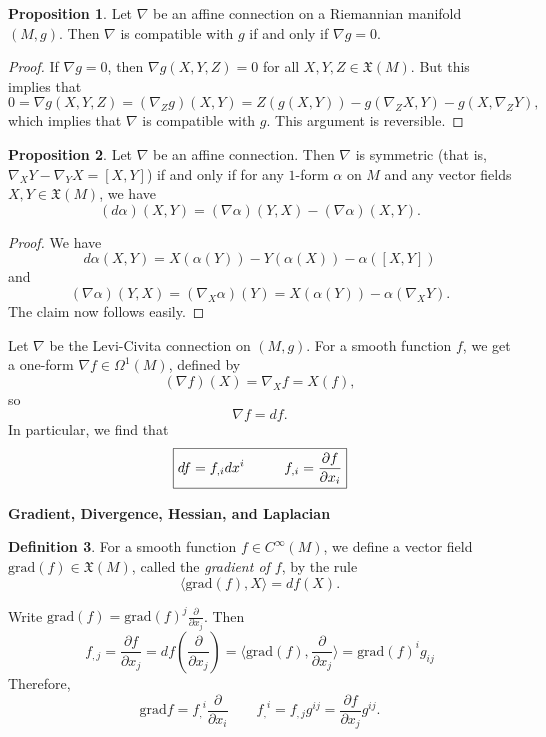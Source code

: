 \documentclass{amsart}
\numberwithin{equation}{section}
\theoremstyle{definition}
\newtheorem{definition}{Definition} [section]
\theoremstyle{theorem}
\newtheorem{proposition}[definition]{Proposition}
\begin{document}
\begin{proposition}
Let $\nabla$ be an affine connection on a Riemannian manifold $(M,g)$. Then $\nabla$ is compatible with $g$ if and only if $\nabla g = 0$. 
\end{proposition}

\begin{proof}
If $\nabla g = 0$, then $\nabla g(X,Y,Z) = 0$ for all $X,Y, Z \in \mathfrak{X}(M)$. But this implies that 
$$
0 = \nabla g(X,Y,Z) = (\nabla_Z g)(X,Y) = Z(g(X,Y)) - g(\nabla_Z X,Y) - g(X, \nabla_Z Y),
$$
which implies that $\nabla$ is compatible with $g$. This argument is reversible. 
\end{proof}

\begin{proposition}
Let $\nabla$ be an affine connection. Then $\nabla$ is symmetric (that is, $\nabla_XY - \nabla_YX = [X,Y]$) if and only if for any $1$-form $\alpha$ on $M$ and any vector fields $X,Y \in \mathfrak{X}(M)$, we have 
\[
(d\alpha)(X,Y) = (\nabla \alpha)(Y,X) - (\nabla \alpha)(X,Y).
\]
\end{proposition}

\begin{proof}
We have 
\[
d\alpha(X,Y) = X(\alpha(Y)) - Y(\alpha(X)) - \alpha([X,Y])
\]
and 
\[
(\nabla \alpha)(Y,X) = (\nabla_X\alpha)(Y) = X(\alpha(Y)) - \alpha(\nabla_X Y).
\]
The claim now follows easily. 
\end{proof}

Let $\nabla$ be the Levi-Civita connection on $(M,g)$. For a smooth function $f$, we get a one-form $\nabla f \in \Omega^1(M)$, defined by 
\[
(\nabla f)(X) = \nabla_X f = X(f),  
\]
so 
\[
\boxed{\nabla f = df.}
\]
In particular, we find that 
\[
\boxed{df = f_{,i}dx^i \hspace{10mm} f_{,i} = \frac{\partial f}{\partial x_i}}
\]

\bigskip

\noindent
{\bf \large Gradient, Divergence, Hessian, and Laplacian}

\begin{definition}
For a smooth function $f \in C^\infty(M)$, we define a vector field $\text{grad}(f) \in \mathfrak{X}(M)$, called 
the {\em gradient of $f$},  by the rule 
\[
\langle \text{grad}(f), X \rangle = df(X).
\]
\end{definition}
Write $\text{grad}(f)=\text{grad}(f)^j\frac{\partial}{\partial x_j}$. Then
$$
f_{,j} = \frac{\partial f}{\partial x_j}= df(\frac{\partial}{\partial x_j})=  \langle \text{grad}(f),\frac{\partial}{\partial x_j}\rangle
= \text{grad}(f)^i g_{ij} 
$$
Therefore,  
\[
\boxed{\text{grad} f = {f_,}^i \frac{\partial}{\partial x_i} \quad \quad  {f_,}^i = f_{,j}g^{ij} = \frac{\partial f}{\partial x_j}g^{ij}.}
\]
\end{document}
